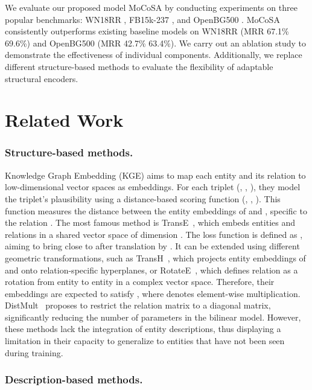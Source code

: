 \documentclass[11pt]{article}
\begin{document}
We evaluate our proposed model MoCoSA by conducting experiments on three popular benchmarks: WN18RR \cite{Dettmers2017Convolutional2K}, FB15k-237 \cite{Ma2015KnowledgeGI}, and OpenBG500 \cite{Deng2022ConstructionAA}. MoCoSA consistently outperforms existing baseline models on WN18RR (MRR 67.1\%  69.6\%) and OpenBG500 (MRR 42.7\%  63.4\%). We carry out an ablation study to demonstrate the effectiveness of individual components. Additionally, we replace different structure-based methods to evaluate the flexibility of adaptable structural encoders.

\section{Related Work}

\subsubsection{Structure-based methods.}

Knowledge Graph Embedding (KGE) aims to map each entity and its relation to low-dimensional vector spaces as embeddings. For each triplet (, , ), they model the triplet's plausibility using a distance-based scoring function (, , ). This function measures the distance between the entity embeddings of  and , specific to the relation . The most famous method is TransE~\cite{bordes2013translating}, which embeds entities and relations in a shared vector space of dimension . The loss function is defined as , aiming to bring  close to  after translation by . 
It can be extended using different geometric transformations, such as TransH~\cite{Wang2014KnowledgeGE}, which projects entity embeddings of  and  onto relation-specific hyperplanes, or RotateE~\cite{sun2018rotate}, which defines relation as a rotation from entity  to entity  in a complex vector space. Therefore, their embeddings are expected to satisfy , where  denotes element-wise multiplication. 
DistMult~\cite{yang2014embedding} proposes to restrict the relation matrix to a diagonal matrix, significantly reducing the number of parameters in the bilinear model. However, these methods lack the integration of entity descriptions, thus displaying a limitation in their capacity to generalize to entities that have not been seen during training.

\subsubsection{Description-based methods.}
\end{document}
